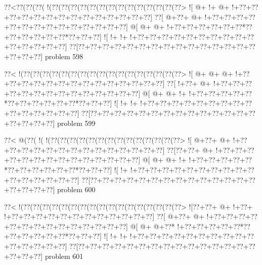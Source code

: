 \vbox{\vbox{\goo
\0??<\0??(\0??(\0??(\- !(\0??(\0??(\0??(\0??(\0??(\0??(\0??(\0??(\0??(\0??(\0??(\0??(\0??(\0??>
\- ![\- @+\- !+\- @+\- !+\0??+\0??+\0??+\0??+\0??+\0??+\0??+\0??+\0??+\0??+\0??+\0??+\0??+\0??]
\0??[\- @+\0??+\- @+\- !+\0??+\0??+\0??+\0??+\0??+\0??+\0??+\0??+\0??+\0??+\0??+\0??+\0??+\0??]
\- @[\- @+\- @+\- !+\0??+\0??+\0??+\0??+\0??+\0??*\0??+\0??+\0??+\0??+\0??+\0??*\0??+\0??+\0??]
\- ![\- !+\- !+\- !+\0??+\0??+\0??+\0??+\0??+\0??+\0??+\0??+\0??+\0??+\0??+\0??+\0??+\0??+\0??]
\0??[\0??+\0??+\0??+\0??+\0??+\0??+\0??+\0??+\0??+\0??+\0??+\0??+\0??+\0??+\0??+\0??+\0??+\0??]
}
\hfil problem 598\hfil\break
}



\vbox{\vbox{\goo
\0??<\- !(\0??(\0??(\0??(\0??(\0??(\0??(\0??(\0??(\0??(\0??(\0??(\0??(\0??(\0??(\0??(\0??(\0??>
\- ![\- @+\- @+\- @+\- !+\0??+\0??+\0??+\0??+\0??+\0??+\0??+\0??+\0??+\0??+\0??+\0??+\0??+\0??]
\0??[\- !+\0??+\- @+\- !+\0??+\0??+\0??+\0??+\0??+\0??+\0??+\0??+\0??+\0??+\0??+\0??+\0??+\0??]
\- @[\- @+\- @+\- !+\- !+\0??+\0??+\0??+\0??+\0??*\0??+\0??+\0??+\0??+\0??+\0??*\0??+\0??+\0??]
\- ![\- !+\- !+\- !+\0??+\0??+\0??+\0??+\0??+\0??+\0??+\0??+\0??+\0??+\0??+\0??+\0??+\0??+\0??]
\0??[\0??+\0??+\0??+\0??+\0??+\0??+\0??+\0??+\0??+\0??+\0??+\0??+\0??+\0??+\0??+\0??+\0??+\0??]
}
\hfil problem 599\hfil\break
}



\vbox{\vbox{\goo
\0??<\- @(\0??(\- !(\- !(\0??(\0??(\0??(\0??(\0??(\0??(\0??(\0??(\0??(\0??(\0??(\0??(\0??(\0??>
\- ![\- @+\0??+\- @+\- !+\0??+\0??+\0??+\0??+\0??+\0??+\0??+\0??+\0??+\0??+\0??+\0??+\0??+\0??]
\0??[\0??+\0??+\- @+\- !+\0??+\0??+\0??+\0??+\0??+\0??+\0??+\0??+\0??+\0??+\0??+\0??+\0??+\0??]
\- @[\- @+\- @+\- !+\- !+\0??+\0??+\0??+\0??+\0??*\0??+\0??+\0??+\0??+\0??+\0??*\0??+\0??+\0??]
\- ![\- !+\- !+\0??+\0??+\0??+\0??+\0??+\0??+\0??+\0??+\0??+\0??+\0??+\0??+\0??+\0??+\0??+\0??]
\0??[\0??+\0??+\0??+\0??+\0??+\0??+\0??+\0??+\0??+\0??+\0??+\0??+\0??+\0??+\0??+\0??+\0??+\0??]
}
\hfil problem 600\hfil\break
}



\vbox{\vbox{\goo
\0??<\- !(\0??(\0??(\0??(\0??(\0??(\0??(\0??(\0??(\0??(\0??(\0??(\0??(\0??(\0??(\0??(\0??(\0??>
\- ![\0??+\0??+\- @+\- !+\0??+\- !+\0??+\0??+\0??+\0??+\0??+\0??+\0??+\0??+\0??+\0??+\0??+\0??]
\0??[\- @+\0??+\- @+\- !+\0??+\0??+\0??+\0??+\0??+\0??+\0??+\0??+\0??+\0??+\0??+\0??+\0??+\0??]
\- @[\- @+\- @+\0??*\- !+\0??+\0??+\0??+\0??+\0??*\0??+\0??+\0??+\0??+\0??+\0??*\0??+\0??+\0??]
\- ![\- !+\- !+\- !+\0??+\0??+\0??+\0??+\0??+\0??+\0??+\0??+\0??+\0??+\0??+\0??+\0??+\0??+\0??]
\0??[\0??+\0??+\0??+\0??+\0??+\0??+\0??+\0??+\0??+\0??+\0??+\0??+\0??+\0??+\0??+\0??+\0??+\0??]
}
\hfil problem 601\hfil\break
}



